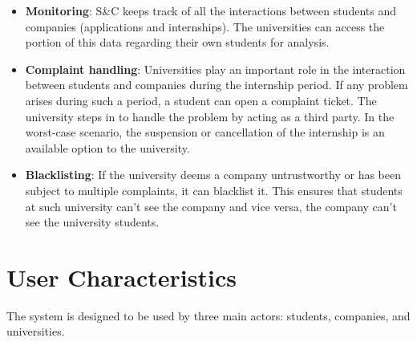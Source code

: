 \begin{itemize}
      \item \textbf{Monitoring}: S\&C keeps track of all the interactions between students and companies (applications
            and internships). The universities can access the portion of this data regarding their own students for
            analysis.
      \item \textbf{Complaint handling}: Universities play an important role in the interaction between students and
            companies during the internship period. If any problem arises during such a period, a student can open a
            complaint ticket. The university steps in to handle the problem by acting as a third party. In the
            worst-case scenario, the suspension or cancellation of the internship is an available option to the
            university.
      \item \textbf{Blacklisting}: If the university deems a company untrustworthy or has been subject to multiple
            complaints, it can blacklist it. This ensures that students at such university can’t see the company and
            vice versa, the company can’t see the university students.
\end{itemize}

\section{User Characteristics}
\label{sec:user_characteristics}%

\par The system is designed to be used by three main actors: students, companies, and universities.

